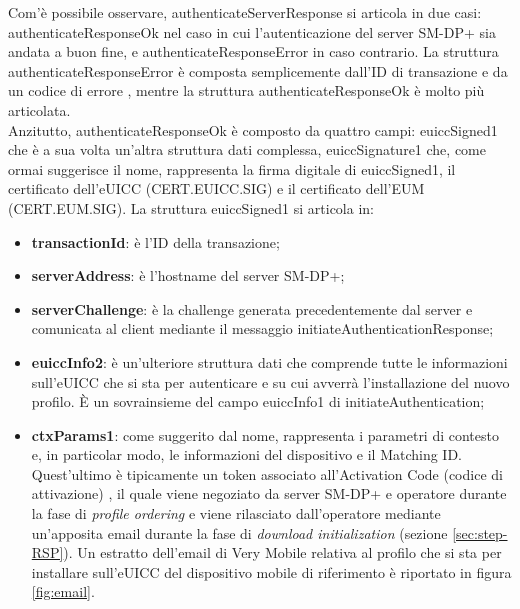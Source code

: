 \documentclass[10pt, oneside]{book}
\begin{document}
Com'è possibile osservare, authenticateServerResponse si articola in due casi: authenticateResponseOk nel caso in cui l'autenticazione del server SM-DP+ sia andata a buon fine, e authenticateResponseError in caso contrario. La struttura authenticateResponseError è composta semplicemente dall'ID di transazione e da un codice di errore \cite{RSP-definitions}, mentre la struttura authenticateResponseOk è molto più articolata.\\
Anzitutto, authenticateResponseOk è composto da quattro campi: euiccSigned1 che è a sua volta un'altra struttura dati complessa, euiccSignature1 che, come ormai suggerisce il nome, rappresenta la firma digitale di euiccSigned1, il certificato dell'eUICC (CERT.EUICC.SIG) e il certificato dell'EUM (CERT.EUM.SIG). La struttura euiccSigned1 si articola in:
\begin{itemize}
\item \textbf{transactionId}: è l'ID della transazione;
\item \textbf{serverAddress}: è l'hostname del server SM-DP+;
\item \textbf{serverChallenge}: è la challenge generata precedentemente dal server e comunicata al client mediante il messaggio initiateAuthenticationResponse;
\item \textbf{euiccInfo2}: è un'ulteriore struttura dati che comprende tutte le informazioni sull'eUICC che si sta per autenticare e su cui avverrà l'installazione del nuovo profilo. È un sovrainsieme del campo euiccInfo1 di initiateAuthentication;
\item \textbf{ctxParams1}: come suggerito dal nome, rappresenta i parametri di contesto e, in particolar modo, le informazioni del dispositivo e il Matching ID. Quest'ultimo è tipicamente un token associato all'Activation Code (codice di attivazione) \cite{RSP-definitions}, il quale viene negoziato da server SM-DP+ e operatore durante la fase di \textit{profile ordering} e viene rilasciato dall'operatore mediante un'apposita email durante la fase di \textit{download initialization} (sezione \ref{sec:step-RSP}). Un estratto dell'email di Very Mobile relativa al profilo che si sta per installare sull'eUICC del dispositivo mobile di riferimento è riportato in figura \ref{fig:email}.
\end{itemize}
\end{document}
